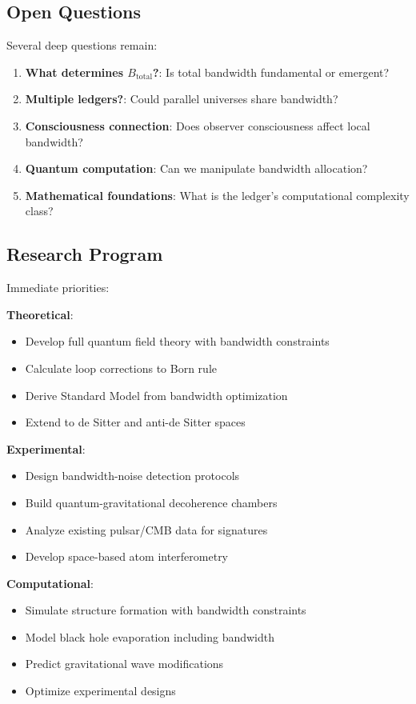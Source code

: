 \documentclass[twocolumn,prd,amsmath,amssymb,aps,superscriptaddress,nofootinbib]{revtex4-2}
\begin{document}
\subsection{Open Questions}

Several deep questions remain:

\begin{enumerate}
\item \textbf{What determines $B_{\text{total}}$?}: Is total bandwidth fundamental or emergent?
\item \textbf{Multiple ledgers?}: Could parallel universes share bandwidth?
\item \textbf{Consciousness connection}: Does observer consciousness affect local bandwidth?
\item \textbf{Quantum computation}: Can we manipulate bandwidth allocation?
\item \textbf{Mathematical foundations}: What is the ledger's computational complexity class?
\end{enumerate}

\subsection{Research Program}

Immediate priorities:

\textbf{Theoretical}:
\begin{itemize}
\item Develop full quantum field theory with bandwidth constraints
\item Calculate loop corrections to Born rule
\item Derive Standard Model from bandwidth optimization
\item Extend to de Sitter and anti-de Sitter spaces
\end{itemize}

\textbf{Experimental}:
\begin{itemize}
\item Design bandwidth-noise detection protocols
\item Build quantum-gravitational decoherence chambers
\item Analyze existing pulsar/CMB data for signatures
\item Develop space-based atom interferometry
\end{itemize}

\textbf{Computational}:
\begin{itemize}
\item Simulate structure formation with bandwidth constraints
\item Model black hole evaporation including bandwidth
\item Predict gravitational wave modifications
\item Optimize experimental designs
\end{itemize}
\end{document}
